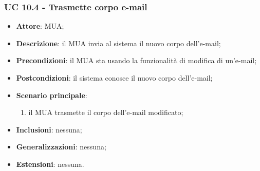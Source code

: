     \subsubsection{UC 10.4 - Trasmette corpo e-mail} \label{sec:UC10.4}
    \begin{itemize}
        \item \textbf{Attore}: MUA;
        \item \textbf{Descrizione}: il MUA invia al sistema il nuovo corpo dell'e-mail;
        \item \textbf{Precondizioni}: il MUA sta usando la funzionalità di modifica di un'e-mail;
        \item \textbf{Postcondizioni}: il sistema conosce il nuovo corpo dell'e-mail;
        \item \textbf{Scenario principale}:
            \begin{enumerate}
                \item il MUA trasmette il corpo dell'e-mail modificato;
            \end{enumerate}
        \item \textbf{Inclusioni}: nessuna;
        \item \textbf{Generalizzazioni}: nessuna;
        \item \textbf{Estensioni}: nessuna.
    \end{itemize}

